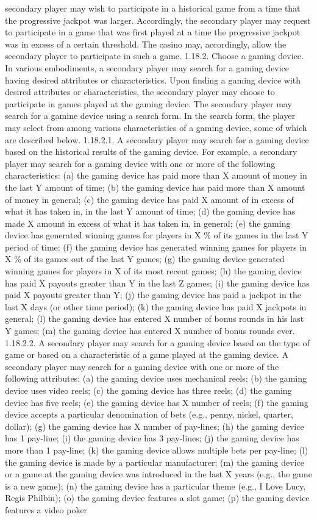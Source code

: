 \documentclass[11pt,a4paper]{article}
\begin{document}
secondary player may wish to participate in a historical game from a time that the progressive jackpot was larger. Accordingly, the secondary player may request to participate in a game that was first played at a time the progressive jackpot was in excess of a certain threshold. The casino may, accordingly, allow the secondary player to participate in such a game. 1.18.2. Choose a gaming device. In various embodiments, a secondary player may search for a gaming device having desired attributes or characteristics. Upon finding a gaming device with desired attributes or characteristics, the secondary player may choose to participate in games played at the gaming device. The secondary player may search for a gamine device using a search form. In the search form, the player may select from among various characteristics of a gaming device, some of which are described below. 1.18.2.1. A secondary player may search for a gaming device based on the historical results of the gaming device. For example, a secondary player may search for a gaming device with one or more of the following characteristics: (a) the gaming device has paid more than X amount of money in the last Y amount of time; (b) the gaming device has paid more than X amount of money in general; (c) the gaming device has paid X amount of in excess of what it has taken in, in the last Y amount of time; (d) the gaming device has made X amount in excess of what it has taken in, in general; (e) the gaming device has generated winning games for players in X \% of its games in the last Y period of time; (f) the gaming device has generated winning games for players in X \% of its games out of the last Y games; (g) the gaming device generated winning games for players in X of its most recent games; (h) the gaming device has paid X payouts greater than Y in the last Z games; (i) the gaming device has paid X payouts greater than Y; (j) the gaming device has paid a jackpot in the last X days (or other time period); (k) the gaming device has paid X jackpots in general; (l) the gaming device has entered X number of bonus rounds in his last Y games; (m) the gaming device has entered X number of bonus rounds ever. 1.18.2.2. A secondary player may search for a gaming device based on the type of game or based on a characteristic of a game played at the gaming device. A secondary player may search for a gaming device with one or more of the following attributes: (a) the gaming device uses mechanical reels; (b) the gaming device uses video reels; (c) the gaming device has three reels; (d) the gaming device has five reels; (e) the gaming device has X number of reels; (f) the gaming device accepts a particular denomination of bets (e.g., penny, nickel, quarter, dollar); (g) the gaming device has X number of pay-lines; (h) the gaming device has 1 pay-line; (i) the gaming device has 3 pay-lines; (j) the gaming device has more than 1 pay-line; (k) the gaming device allows multiple bets per pay-line; (l) the gaming device is made by a particular manufacturer; (m) the gaming device or a game at the gaming device was introduced in the last X years (e.g., the game is a new game); (n) the gaming device has a particular theme (e.g., I Love Lucy, Regis Philbin); (o) the gaming device features a slot game; (p) the gaming device features a video poker 
\end{document}
